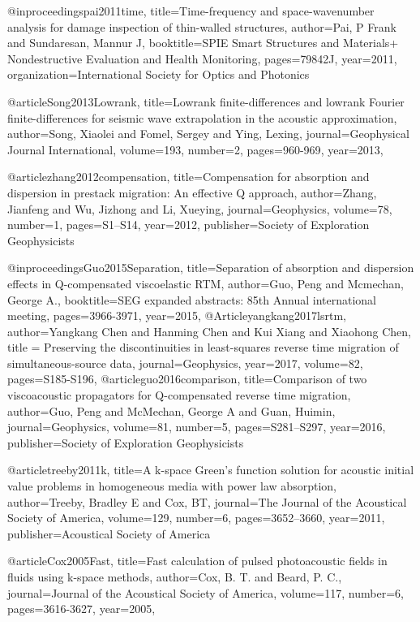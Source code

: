 {@inproceedings{pai2011time,
  title={Time-frequency and space-wavenumber analysis for damage inspection of thin-walled structures},
  author={Pai, P Frank and Sundaresan, Mannur J},
  booktitle={SPIE Smart Structures and Materials+ Nondestructive Evaluation and Health Monitoring},
  pages={79842J},
  year={2011},
  organization={International Society for Optics and Photonics}
}


@article{Song2013Lowrank,
  title={Lowrank finite-differences and lowrank Fourier finite-differences for seismic wave extrapolation in the acoustic approximation},
  author={Song, Xiaolei and Fomel, Sergey and Ying, Lexing},
  journal={Geophysical Journal International},
  volume={193},
  number={2},
  pages={960-969},
  year={2013},
}

@article{zhang2012compensation,
  title={Compensation for absorption and dispersion in prestack migration: {A}n effective {Q} approach},
  author={Zhang, Jianfeng and Wu, Jizhong and Li, Xueying},
  journal={Geophysics},
  volume={78},
  number={1},
  pages={S1--S14},
  year={2012},
  publisher={Society of Exploration Geophysicists}
}

@inproceedings{Guo2015Separation,
  title={Separation of absorption and dispersion effects in {Q}-compensated viscoelastic {RTM}},
  author={Guo, Peng and Mcmechan, George A.},
  booktitle={SEG expanded abstracts: 85th Annual international meeting},
  pages={3966-3971},
  year={2015},
}
@Article{yangkang2017lsrtm,
  author={Yangkang Chen and Hanming Chen and Kui Xiang and Xiaohong Chen},
  title = {Preserving the discontinuities in least-squares reverse time migration of simultaneous-source data},
  journal={Geophysics},
  year=2017,
  volume=82,
  pages={S185-S196},
}
@article{guo2016comparison,
  title={Comparison of two viscoacoustic propagators for {Q}-compensated reverse time migration},
  author={Guo, Peng and McMechan, George A and Guan, Huimin},
  journal={Geophysics},
  volume={81},
  number={5},
  pages={S281--S297},
  year={2016},
  publisher={Society of Exploration Geophysicists}
}


@article{treeby2011k,
  title={A k-space Green's function solution for acoustic initial value problems in homogeneous media with power law absorption},
  author={Treeby, Bradley E and Cox, BT},
  journal={The Journal of the Acoustical Society of America},
  volume={129},
  number={6},
  pages={3652--3660},
  year={2011},
  publisher={Acoustical Society of America}
}

@article{Cox2005Fast,
  title={Fast calculation of pulsed photoacoustic fields in fluids using k-space methods},
  author={Cox, B. T. and Beard, P. C.},
  journal={Journal of the Acoustical Society of America},
  volume={117},
  number={6},
  pages={3616-3627},
  year={2005},
}

}
